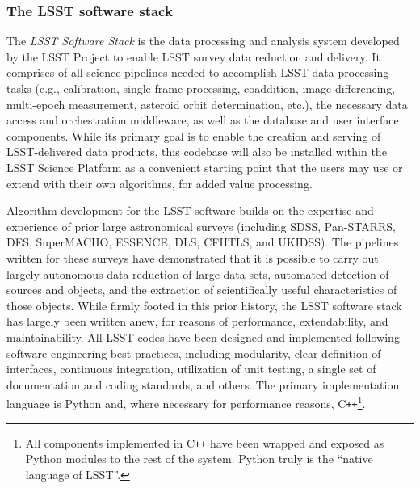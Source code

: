 \subsubsection{The LSST software stack}
\label{sec:dmstack}

The {\em LSST Software Stack} is the data processing and analysis
system developed by the LSST Project to enable LSST survey data
reduction and delivery. It comprises of
all science pipelines needed to accomplish LSST data processing tasks
(e.g., calibration, single frame processing, coaddition, image
differencing, multi-epoch measurement, asteroid orbit determination,
etc.), the necessary data
access and orchestration middleware, as well as the database and user
interface components. While its primary goal is to enable the creation
and serving of LSST-delivered data products, this codebase will also
be installed within the LSST Science Platform as a convenient starting
point that the users may use or extend with their own algorithms, for added
value processing.

Algorithm development for the LSST software builds on the expertise
and experience of prior large astronomical surveys (including SDSS,
Pan-STARRS, DES,
SuperMACHO, ESSENCE,  DLS, CFHTLS, and UKIDSS). The pipelines written
for these surveys have demonstrated that it is possible to carry out
largely autonomous data
reduction of large data sets, automated detection of sources and
objects, and the
extraction of scientifically useful characteristics of those objects.
While firmly footed in this prior history, the LSST software stack has
largely been written anew, for reasons of performance, extendability, and
maintainability. All LSST codes have been designed and implemented
following software engineering best practices, including modularity, clear definition
of interfaces, continuous integration,
utilization of unit testing, a single set of documentation and coding
standards, and others. The primary implementation language is Python and, where
necessary for performance reasons, C\texttt{++}\footnote{All components implemented
in C\texttt{++} have been wrapped and exposed as Python modules to the rest of the system. Python truly is the ``native language of LSST''.}.

